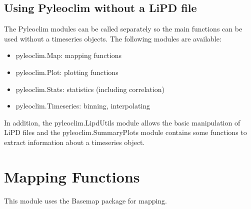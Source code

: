 \documentclass[letterpaper,10pt,english]{sphinxmanual}
\begin{document}
\section{Using Pyleoclim without a LiPD file}
\label{\detokenize{Main:using-pyleoclim-without-a-lipd-file}}
The Pyleoclim modules can be called separately so the main functions can be used without a timeseries objects.
The following modules are available:
\begin{itemize}
\item {} 
pyleoclim.Map: mapping functions

\item {} 
pyleoclim.Plot: plotting functions

\item {} 
pyleoclim.Stats: statistics (including correlation)

\item {} 
pyleoclim.Timeseries: binning, interpolating

\end{itemize}

In addition, the pyleoclim.LipdUtils module allows the basic manipulation of LiPD files and the pyleoclim.SummaryPlots module
contains some functions to extract information about a timeseries object.


\chapter{Mapping Functions}
\label{\detokenize{Map:mapping-functions}}\label{\detokenize{Map::doc}}
This module uses the Basemap package for mapping.
\end{document}
